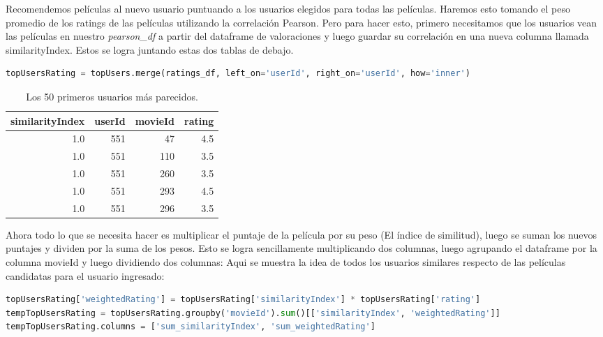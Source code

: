 \documentclass{uimppracticas}
\begin{document}
Recomendemos películas al nuevo usuario puntuando a los usuarios elegidos para todas las películas. Haremos esto tomando el peso promedio de los ratings de las películas utilizando la correlación Pearson. Pero para hacer esto, primero necesitamos que los usuarios vean las películas en nuestro \textit{pearson\_df} a partir del dataframe de valoraciones y luego guardar su correlación en una nueva columna llamada similarityIndex. Estos se logra juntando estas dos tablas de debajo.

\begin{lstlisting}[language=python]
topUsersRating = topUsers.merge(ratings_df, left_on='userId', right_on='userId', how='inner')
\end{lstlisting}

\begin{table}[h]
	\centering
	\begin{tabular}{rrrr}
		\toprule
		similarityIndex &  userId &  movieId &  rating \\
		\midrule
		1.0 &     551 &       47 &     4.5 \\
		1.0 &     551 &      110 &     3.5 \\
		1.0 &     551 &      260 &     3.5 \\
		1.0 &     551 &      293 &     4.5 \\
		1.0 &     551 &      296 &     3.5 \\
		\bottomrule
	\end{tabular}
	\caption{Los 50 primeros usuarios más parecidos.}
	\label{usuarios_parecidos}
\end{table}

Ahora todo lo que se necesita hacer es multiplicar el puntaje de la película por su peso (El índice de similitud), luego se suman los nuevos puntajes y dividen por la suma de los pesos.
Esto se logra sencillamente multiplicando dos columnas, luego agrupando el dataframe por la columna movieId y luego dividiendo dos columnas:
Aqui se muestra la idea de todos los usuarios similares respecto de las películas candidatas para el usuario ingresado:

\begin{lstlisting}[language=python]
topUsersRating['weightedRating'] = topUsersRating['similarityIndex'] * topUsersRating['rating']
tempTopUsersRating = topUsersRating.groupby('movieId').sum()[['similarityIndex', 'weightedRating']]
tempTopUsersRating.columns = ['sum_similarityIndex', 'sum_weightedRating']
\end{lstlisting}
\end{document}

